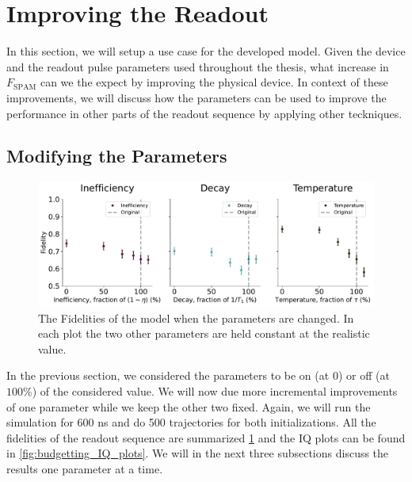 \section{Improving the Readout}
In this section, we will setup a use case for the developed model. Given the device and the readout pulse parameters used throughout the thesis, what increase in $F_{\text{SPAM}}$ can we the expect by improving the physical device. In context of these improvements, we will discuss how the parameters can be used to improve the performance in other parts of the readout sequence by applying other teckniques. 




\subsection{Modifying the Parameters}
\begin{figure}[t]
    \centering
    \includegraphics[width = \linewidth]{Simulations/budgets/figures/fidelities_at_different_parameters.pdf}
    \caption{The Fidelities of the model when the parameters are changed. In each plot the two other parameters are held constant at the realistic value.}
    \label{fig:scan_of_fidelities_at_different_parameters}
\end{figure}
In the previous section, we considered the parameters to be on (at $0$) or off (at $100 \%$) of the considered value. We will now due more incremental improvements of one parameter while we keep the other two fixed. Again, we will run the simulation for 600 ns and do 500 trajectories for both initializations. All the fidelities of the readout sequence are summarized \ref{fig:scan_of_fidelities_at_different_parameters} and the IQ plots can be found in \ref{fig:budgetting_IQ_plots}. We will in the next three subsections discuss the results one parameter at a time.

